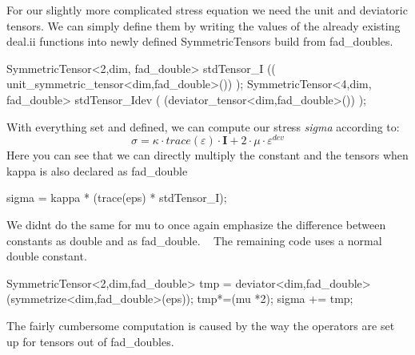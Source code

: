 For our slightly more complicated stress equation we need the unit and deviatoric tensors. We can simply define them by writing the values of the already existing deal.\+ii functions into newly defined Symmetric\+Tensors build from fad\+\_\+doubles. 
\begin{DoxyCode}
SymmetricTensor<2,dim, fad\_double> stdTensor\_I (( unit\_symmetric\_tensor<dim,fad\_double>()) );
SymmetricTensor<4,dim, fad\_double> stdTensor\_Idev ( (deviator\_tensor<dim,fad\_double>()) );
\end{DoxyCode}
 With everything set and defined, we can compute our stress {\itshape sigma} according to\+: \[ \sigma = \kappa \cdot trace(\varepsilon) \cdot \boldsymbol{I} + 2 \cdot \mu \cdot \varepsilon^{dev} \] Here you can see that we can directly multiply the constant and the tensors when kappa is also declared as fad\+\_\+double 
\begin{DoxyCode}
sigma = kappa * (trace(eps) *  stdTensor\_I);
\end{DoxyCode}
 We didn\textquotesingle{}t do the same for mu to once again emphasize the difference between constants as double and as fad\+\_\+double. ~\newline
The remaining code uses a normal double constant. 
\begin{DoxyCode}
SymmetricTensor<2,dim,fad\_double> tmp = deviator<dim,fad\_double>(symmetrize<dim,fad\_double>(eps)); tmp*=(mu
      *2);
sigma +=  tmp;
\end{DoxyCode}
 The fairly cumbersome computation is caused by the way the operators are set up for tensors out of fad\+\_\+doubles.


